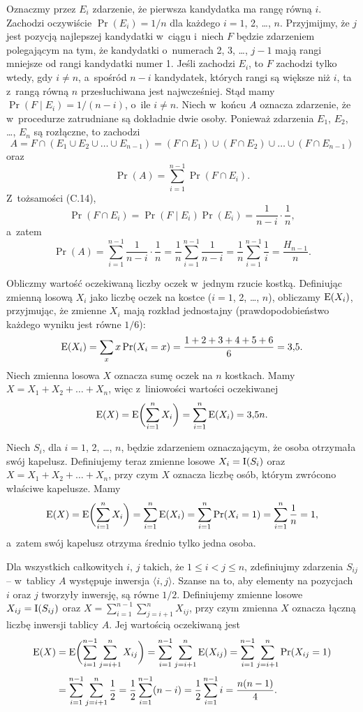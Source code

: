 Oznaczmy przez $E_i$ zdarzenie, że pierwsza kandydatka ma rangę równą $i$.
Zachodzi oczywiście $\Pr(E_i)=1/n$ dla każdego $i=1$, 2, \dots, $n$.
Przyjmijmy, że $j$ jest pozycją najlepszej kandydatki w~ciągu i~niech $F$ będzie zdarzeniem polegającym na tym, że kandydatki o~numerach 2, 3, \dots, $j-1$ mają rangi mniejsze od rangi kandydatki numer 1.
Jeśli zachodzi $E_i$, to $F$ zachodzi tylko wtedy, gdy $i\ne n$, a~spośród $n-i$ kandydatek, których rangi są większe niż $i$, ta z~rangą równą $n$ przesłuchiwana jest najwcześniej.
Stąd mamy $\Pr(F\mid E_i)=1/(n-i)$, o~ile $i\ne n$.
Niech w~końcu $A$ oznacza zdarzenie, że w~procedurze  zatrudniane są dokładnie dwie osoby.
Ponieważ zdarzenia $E_1$, $E_2$, \dots, $E_n$ są rozłączne, to zachodzi
\[
	A = F\cap(E_1\cup E_2\cup\dots\cup E_{n-1}) = (F\cap E_1)\cup(F\cap E_2)\cup\dots\cup(F\cap E_{n-1})
\]
oraz
\[
	\Pr(A) = \sum_{i=1}^{n-1}\Pr(F\cap E_i).
\]
Z~tożsamości (C.14),
\[
	\Pr(F\cap E_i) = \Pr(F\mid E_i)\Pr(E_i) = \frac{1}{n-i}\cdot\frac{1}{n},
\]
a~zatem
\[
	\Pr(A) = \sum_{i=1}^{n-1}\frac{1}{n-i}\cdot\frac{1}{n} = \frac{1}{n}\sum_{i=1}^{n-1}\frac{1}{n-i} = \frac{1}{n}\sum_{i=1}^{n-1}\frac{1}{i} = \frac{H_{n-1}}{n}.
\]

\exercise %
Obliczmy wartość oczekiwaną liczby oczek w~jednym rzucie kostką.
Definiując zmienną losową $X_i$ jako liczbę oczek na  kostce ($i=1$, 2, \dots, $n$), obliczamy $\operatorname{E}(X_i)$, przyjmując, że zmienne $X_i$ mają rozkład jednostajny (prawdopodobieństwo każdego wyniku jest równe $1/6$):
\[
	\operatorname{E}(X_i) = \sum_xx\Pr(X_i=x) = \frac{1+2+3+4+5+6}{6} = 3{,}5.
\]
Niech zmienna losowa $X$ oznacza sumę oczek na $n$ kostkach.
Mamy $X=X_1+X_2+\dots+X_n$, więc z~liniowości wartości oczekiwanej
\[
	\operatorname{E}(X) = \operatorname{E}\biggl(\sum_{i=1}^nX_i\biggr) = \sum_{i=1}^n\operatorname{E}(X_i) = 3{,}5n.
\]

\exercise %
Niech $S_i$, dla $i=1$, 2, \dots, $n$, będzie zdarzeniem oznaczającym, że  osoba otrzymała swój kapelusz.
Definiujemy teraz zmienne losowe $X_i=\operatorname{I}(S_i)$ oraz $X=X_1+X_2+\dots+X_n$, przy czym $X$ oznacza liczbę osób, którym zwrócono właściwe kapelusze.
Mamy
\[
	\operatorname{E}(X) = \operatorname{E}\biggl(\sum_{i=1}^nX_i\biggr) = \sum_{i=1}^n\operatorname{E}(X_i) = \sum_{i=1}^n\Pr(X_i=1) = \sum_{i=1}^n\frac{1}{n} = 1,
\]
a~zatem swój kapelusz otrzyma średnio tylko jedna osoba.

\exercise %
Dla wszystkich całkowitych $i$, $j$ takich, że $1\le i<j\le n$, zdefiniujmy zdarzenia $S_{ij}$ -- w~tablicy $A$ występuje inwersja $\langle i,j\rangle$.
Szanse na to, aby elementy na pozycjach $i$ oraz $j$ tworzyły inwersję, są równe $1/2$.
Definiujemy zmienne losowe $X_{ij}=\operatorname{I}(S_{ij})$ oraz $X=\sum_{i=1}^{n-1}\sum_{j=i+1}^nX_{ij}$, przy czym zmienna $X$ oznacza łączną liczbę inwersji tablicy $A$.
Jej wartością oczekiwaną jest
\begin{align*}
	\operatorname{E}(X) &= \operatorname{E}\biggl(\sum_{i=1}^{n-1}\sum_{j=i+1}^nX_{ij}\biggr) = \sum_{i=1}^{n-1}\sum_{j=i+1}^n\operatorname{E}(X_{ij}) = \sum_{i=1}^{n-1}\sum_{j=i+1}^n\Pr(X_{ij}=1) \\[1mm]
	&= \sum_{i=1}^{n-1}\sum_{j=i+1}^n\frac{1}{2} = \frac{1}{2}\sum_{i=1}^{n-1}(n-i) = \frac{1}{2}\sum_{i=1}^{n-1}i = \frac{n(n-1)}{4}.
\end{align*}

